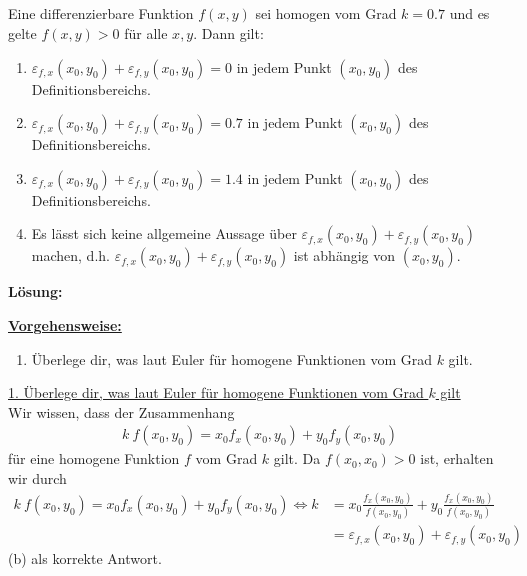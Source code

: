 \subsection*{}
Eine differenzierbare Funktion $f(x,y)$ sei homogen vom Grad $k = 0.7$ und es gelte $f(x,y) > 0$ für alle $x,y$.
Dann gilt:
\renewcommand{\labelenumi}{(\alph{enumi})}
\begin{enumerate}
\item $\varepsilon_{f,x}(x_0,y_0) + \varepsilon_{f,y}(x_0,y_0) = 0$ in jedem Punkt $(x_0,y_0)$ des Definitionsbereichs.
\item $\varepsilon_{f,x}(x_0,y_0) + \varepsilon_{f,y}(x_0,y_0) = 0.7$ in jedem Punkt $(x_0,y_0)$ des Definitionsbereichs.
\item $\varepsilon_{f,x}(x_0,y_0) + \varepsilon_{f,y}(x_0,y_0) = 1.4$ in jedem Punkt $(x_0,y_0)$ des Definitionsbereichs.
\item Es lässt sich keine allgemeine Aussage über $\varepsilon_{f,x}(x_0,y_0) + \varepsilon_{f,y}(x_0,y_0)$ machen,
d.h. $\varepsilon_{f,x}(x_0,y_0) + \varepsilon_{f,y}(x_0,y_0)$ ist abhängig von $(x_0,y_0)$.
\end{enumerate}
\textbf{Lösung:}
\begin{mdframed}
\underline{\textbf{Vorgehensweise:}}
\renewcommand{\labelenumi}{\theenumi.}
\begin{enumerate}
\item Überlege dir, was laut Euler für homogene Funktionen vom Grad $k$ gilt.

\end{enumerate}
\end{mdframed}

\underline{1. Überlege dir, was laut Euler für homogene Funktionen vom Grad $k$ gilt }\\
Wir wissen, dass der Zusammenhang
\begin{align*}
k \ f(x_0,y_0) = x_0 f_x(x_0,y_0) + y_0 f_y(x_0,y_0)
\end{align*}
für eine homogene Funktion $f$ vom Grad $k$ gilt.
Da $f(x_0,x_0) >0 $ ist, erhalten wir durch
\begin{align*}
k \ f(x_0,y_0) = x_0 f_x(x_0,y_0) + y_0 f_y(x_0,y_0)
\Leftrightarrow
k  &= x_0 \frac{f_x(x_0,y_0)}{f(x_0,y_0)} + y_0 \frac{f_x(x_0,y_0)}{f(x_0,y_0)}\\
&= \varepsilon_{f,x}(x_0,y_0) + \varepsilon_{f,y}(x_0,y_0)
\end{align*}
(b) als korrekte Antwort.